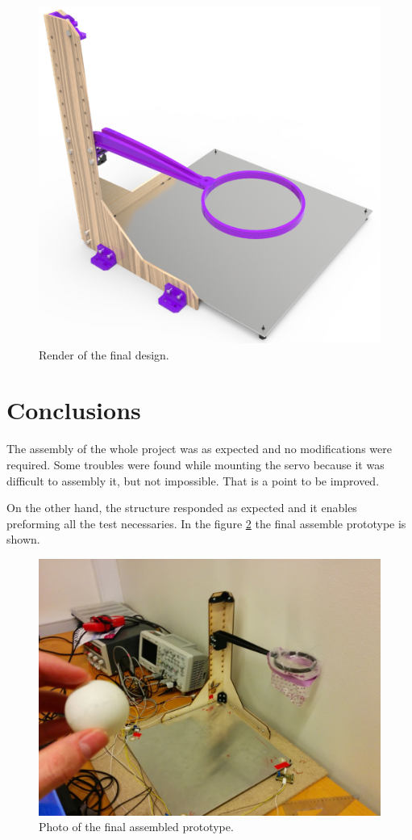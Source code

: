 		\begin{figure}[htb]
			\begin{center}
				\includegraphics[width=.8\textwidth]{figures/render2}
			\end{center}
			\caption{Render of the final design.}
			\label{fig:render2}
		\end{figure}

	\section{Conclusions} %
	\label{sec:mechanics_conclusions}
		The assembly of the whole project was as expected and no modifications were required. Some troubles were found while mounting the servo because it was difficult to assembly it, but not impossible. That is a point to be improved.

		On the other hand, the structure responded as expected and it enables preforming all the test necessaries. In the figure \ref{fig:photo1} the final assemble prototype is shown.

		\begin{figure}[htb]
			\begin{center}
				\includegraphics[width=.8\textwidth]{figures/photo1}
			\end{center}
			\caption{Photo of the final assembled prototype.}
			\label{fig:photo1}
		\end{figure}
